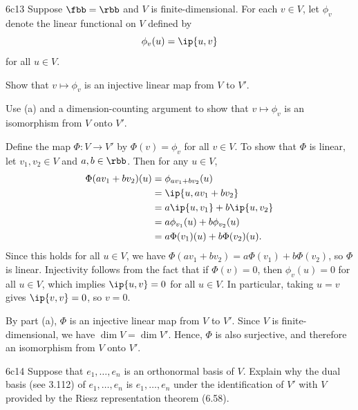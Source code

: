 \begin{exercise}{6c13}
    Suppose $\fbb = \rbb$ and $V$ is finite-dimensional.
    For each $v \in V$, let $\phi_v$ denote the linear functional on $V$ defined by
    \[
        \phi_v(u) = \ip{u, v}
    \]
    for all $u \in V$.
    \begin{subexercises}
        \item Show that $v \mapsto \phi_v$ is an injective linear map from $V$ to $V'$.
        \item Use (a) and a dimension-counting argument to show that $v \mapsto \phi_v$ is an isomorphism from $V$ onto $V'$.
    \end{subexercises}
\end{exercise}

\begin{solenum}
    \item Define the map $\Phi : V \to V'$ by $\Phi(v) = \phi_v$ for all $v \in V$.
    To show that $\Phi$ is linear, let $v_1, v_2 \in V$ and $a, b \in \rbb$.
    Then for any $u \in V$,
    \begin{align*}
        \Phi(av_1 + bv_2)(u) &= \phi_{av_1 + bv_2}(u) \\
        &= \ip{u, av_1 + bv_2} \\
        &= a\ip{u, v_1} + b\ip{u, v_2} \\
        &= a\phi_{v_1}(u) + b\phi_{v_2}(u) \\
        &= a\Phi(v_1)(u) + b\Phi(v_2)(u).
    \end{align*}
    Since this holds for all $u \in V$, we have $\Phi(av_1 + bv_2) = a\Phi(v_1) + b\Phi(v_2)$, so $\Phi$ is linear.
    Injectivity follows from the fact that if $\Phi(v) = 0$, then $\phi_v(u) = 0$ for all $u \in V$, which implies $\ip{u, v} = 0$ for all $u \in V$.
    In particular, taking $u = v$ gives $\ip{v, v} = 0$, so $v = 0$.
    \item By part (a), $\Phi$ is an injective linear map from $V$ to $V'$.
    Since $V$ is finite-dimensional, we have $\dim V = \dim V'$.
    Hence, $\Phi$ is also surjective, and therefore an isomorphism from $V$ onto $V'$.
\end{solenum}

\begin{exercise}{6c14}
    Suppose that $e_1, \ldots, e_n$ is an orthonormal basis of $V$.
    Explain why the dual basis (see 3.112) of $e_1, \ldots, e_n$ is $e_1, \ldots, e_n$ under the identification of $V'$ with $V$ provided by the Riesz representation theorem (6.58).
\end{exercise}

